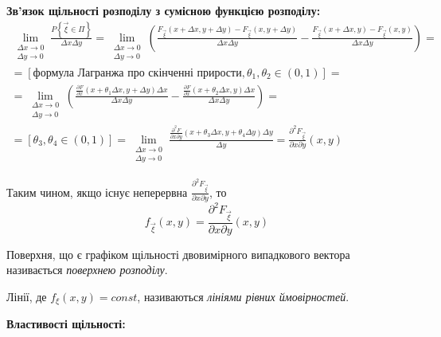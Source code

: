 \noindent\textbf{Зв’язок щільності розподілу з сумісною функцією розподілу: }
\begin{gather*}
    \lim_{\substack{\Delta x \to 0 \\ 
\Delta y \to 0}} \frac{P\left\{\vec{\xi} \in \Pi\right\}}
{\Delta x \Delta y} = 
\lim_{\substack{\Delta x \to 0 \\ \Delta y \to 0}} 
\left(
    \frac{F_{\vec{\xi}}(x+\Delta x, y+\Delta y) - F_{\vec{\xi}}(x, y+\Delta y)}
    {\Delta x \Delta y}
    -
    \frac{F_{\vec{\xi}}(x+\Delta x, y) - F_{\vec{\xi}}(x, y)}
    {\Delta x \Delta y}
\right) = \\
= \left[\text{формула Лагранжа про скінченні прирости}, \theta_1, \theta_2 \in (0, 1)\right] = \\
= \lim_{\substack{\Delta x \to 0 \\ \Delta y \to 0}} 
\left(
    \frac{\frac{\partial F}{\partial x}(x + \theta_1 \Delta x, y + \Delta y)\Delta x}
    {\Delta x \Delta y}
    -
    \frac{\frac{\partial F}{\partial x}(x + \theta_2 \Delta x, y)\Delta x}
    {\Delta x \Delta y}
\right) =  \\
= \left[\theta_3, \theta_4 \in (0, 1)\right] 
= \lim_{\substack{\Delta x \to 0 \\ \Delta y \to 0}}
\frac{\frac{\partial^2 F}{\partial x \partial y}(x + \theta_3 \Delta x, 
y + \theta_4 \Delta y)\Delta y}
{\Delta y} = \frac{\partial^2 F_{\vec{\xi}}}{\partial x \partial y}(x, y)\end{gather*}

Таким чином, якщо існує неперервна $ \frac{\partial^2 F_{\vec{\xi}}}{\partial x \partial y}$, то
\begin{equation}\label{eq:dens_r2}
    f_{\vec{\xi}}(x, y) = \frac{\partial^2 F_{\vec{\xi}}}{\partial x \partial y}(x, y)
\end{equation}

\begin{definition}
    Поверхня, що є графіком щільності двовимірного випадкового вектора називається 
    \emph{поверхнею розподілу}.
\end{definition}
\begin{definition}
    Лінії, де $f_\xi(x, y) = const$, називаються \emph{лініями рівних ймовірностей}.
\end{definition}

\noindent\textbf{Властивості щільності: }

